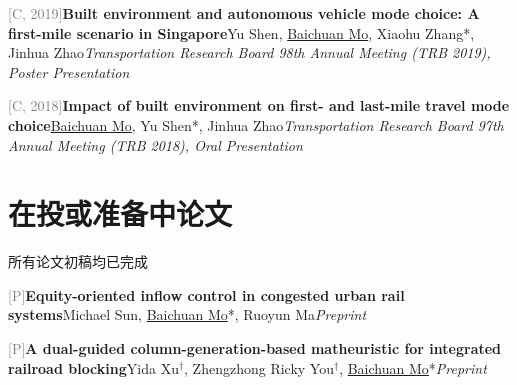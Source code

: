 \par\noindent\begin{minipage}{\linewidth}
{\textcolor{gray}{[C\themyCounterNew, 2019]\;}}{\textbf{Built environment and autonomous vehicle mode choice: A first-mile scenario in Singapore}}{\newline Yu Shen, \underline{Baichuan Mo}, Xiaohu Zhang*, Jinhua Zhao}{\newline \emph{Transportation Research Board 98th Annual Meeting (TRB 2019), Poster Presentation}}{{}}{}
\end{minipage}\par\vspace{5.5pt}


\par\noindent\begin{minipage}{\linewidth}
{\textcolor{gray}{[C\themyCounterNew, 2018]\;}}{\textbf{Impact of built environment on first- and last-mile travel mode choice}}{\newline \underline{Baichuan Mo}, Yu Shen*, Jinhua Zhao}{\newline \emph{Transportation Research Board 97th Annual Meeting (TRB 2018), Oral Presentation}}{{}}{}
\end{minipage}\par\vspace{5.5pt}


\vspace{7pt}

\section{在投或准备中论文}
{\small{所有论文初稿均已完成}}{}{}{}

\vspace{7pt}
\par\noindent\begin{minipage}{\linewidth}
{\textcolor{gray}{[P\themyPrePrint]\;}}{\textbf{Equity-oriented inflow control in congested urban rail systems}}{\newline Michael Sun, \underline{Baichuan Mo}*, Ruoyun Ma}{\newline \emph{Preprint}}{{}}{}
\end{minipage}\par\vspace{5.5pt}


\par\noindent\begin{minipage}{\linewidth}
{\textcolor{gray}{[P\themyPrePrint]\;}}{\textbf{A dual-guided column-generation-based matheuristic for integrated railroad blocking}}{\newline Yida Xu$^\dagger$, Zhengzhong Ricky You$^\dagger$, \underline{Baichuan Mo}*}{\newline \emph{Preprint}}{{}}{}
\end{minipage}\par\vspace{5.5pt}


